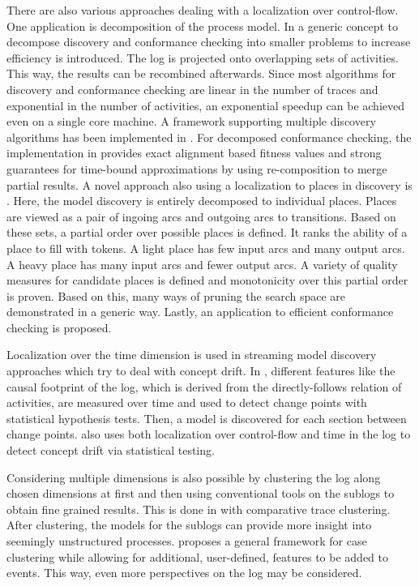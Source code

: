 There are also various approaches dealing with a localization over control-flow.
One application is decomposition of the process model. In \cite{van2013decomposing} a generic concept to decompose discovery and conformance checking into smaller problems to increase efficiency is introduced. The log is projected onto overlapping sets of activities. This way, the results can be recombined afterwards. Since most algorithms for discovery and conformance checking are linear in the number of traces and exponential in the number of activities, an exponential speedup can be achieved even on a single core machine. A framework supporting multiple discovery algorithms has been implemented in \cite{verbeek2017divide}. For decomposed conformance checking, the implementation in \cite{lee2018recomposing} provides exact alignment based fitness values and strong guarantees for time-bound approximations by using re-composition to merge partial results.
A novel approach also using a localization to places in discovery is \cite{van2018discovering}. Here, the model discovery is entirely decomposed to individual places. Places are viewed as a pair of ingoing arcs and outgoing arcs to transitions. Based on these sets, a partial order over possible places is defined. It ranks the ability of a place to fill with tokens. A light place has few input arcs and many output arcs. A heavy place has many input arcs and fewer output arcs. A variety of quality measures for candidate places is defined and monotonicity over this partial order is proven. Based on this, many ways of pruning the search space are demonstrated in a generic way. Lastly, an application to efficient conformance checking is proposed.

Localization over the time dimension is used in streaming model discovery approaches which try to deal with concept drift. In \cite{bose2011handling}, different features like the causal footprint of the log, which is derived from the directly-follows relation of activities, are measured over time and used to detect change points with statistical hypothesis tests. Then, a model is discovered for each section between change points. \cite{manoj15capturing} also uses both localization over control-flow and time in the log to detect concept drift via statistical testing.

Considering multiple dimensions is also possible by clustering the log along chosen dimensions at first and then using conventional tools on the sublogs to obtain fine grained results. This is done in \cite{hompes2015detecting} with comparative trace clustering. After clustering, the models for the sublogs can provide more insight into seemingly unstructured processes. \cite{de2016general} proposes a general framework for case clustering while allowing for additional, user-defined, features to be added to events. This way, even more perspectives on the log may be considered.

